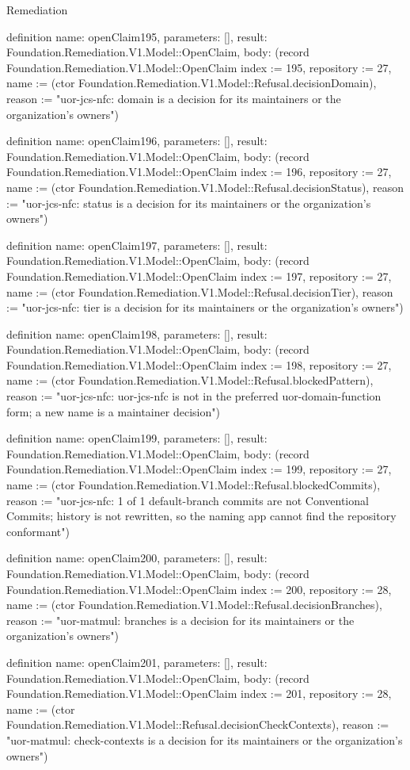 \begin{lexlean}{Remediation}
\begin{semanticmodule}
definition{
  name: openClaim195,
  parameters: [],
  result: Foundation.Remediation.V1.Model::OpenClaim,
  body: (record Foundation.Remediation.V1.Model::OpenClaim {index := 195, repository := 27, name := (ctor Foundation.Remediation.V1.Model::Refusal.decisionDomain), reason := "uor-jcs-nfc: domain is a decision for its maintainers or the organization's owners"})
}

definition{
  name: openClaim196,
  parameters: [],
  result: Foundation.Remediation.V1.Model::OpenClaim,
  body: (record Foundation.Remediation.V1.Model::OpenClaim {index := 196, repository := 27, name := (ctor Foundation.Remediation.V1.Model::Refusal.decisionStatus), reason := "uor-jcs-nfc: status is a decision for its maintainers or the organization's owners"})
}

definition{
  name: openClaim197,
  parameters: [],
  result: Foundation.Remediation.V1.Model::OpenClaim,
  body: (record Foundation.Remediation.V1.Model::OpenClaim {index := 197, repository := 27, name := (ctor Foundation.Remediation.V1.Model::Refusal.decisionTier), reason := "uor-jcs-nfc: tier is a decision for its maintainers or the organization's owners"})
}

definition{
  name: openClaim198,
  parameters: [],
  result: Foundation.Remediation.V1.Model::OpenClaim,
  body: (record Foundation.Remediation.V1.Model::OpenClaim {index := 198, repository := 27, name := (ctor Foundation.Remediation.V1.Model::Refusal.blockedPattern), reason := "uor-jcs-nfc: uor-jcs-nfc is not in the preferred uor-{domain}-{function} form; a new name is a maintainer decision"})
}

definition{
  name: openClaim199,
  parameters: [],
  result: Foundation.Remediation.V1.Model::OpenClaim,
  body: (record Foundation.Remediation.V1.Model::OpenClaim {index := 199, repository := 27, name := (ctor Foundation.Remediation.V1.Model::Refusal.blockedCommits), reason := "uor-jcs-nfc: 1 of 1 default-branch commits are not Conventional Commits; history is not rewritten, so the naming app cannot find the repository conformant"})
}

definition{
  name: openClaim200,
  parameters: [],
  result: Foundation.Remediation.V1.Model::OpenClaim,
  body: (record Foundation.Remediation.V1.Model::OpenClaim {index := 200, repository := 28, name := (ctor Foundation.Remediation.V1.Model::Refusal.decisionBranches), reason := "uor-matmul: branches is a decision for its maintainers or the organization's owners"})
}

definition{
  name: openClaim201,
  parameters: [],
  result: Foundation.Remediation.V1.Model::OpenClaim,
  body: (record Foundation.Remediation.V1.Model::OpenClaim {index := 201, repository := 28, name := (ctor Foundation.Remediation.V1.Model::Refusal.decisionCheckContexts), reason := "uor-matmul: check-contexts is a decision for its maintainers or the organization's owners"})
}


\end{semanticmodule}
\end{lexlean}
